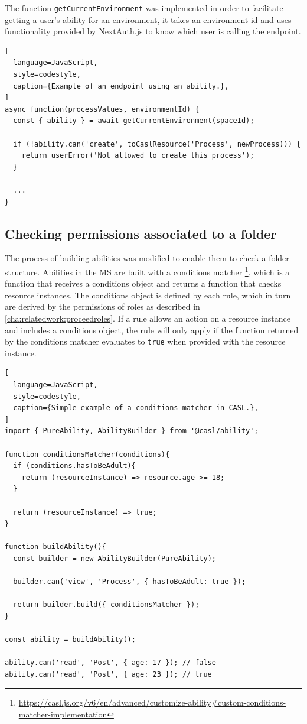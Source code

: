 The function \lstinline{getCurrentEnvironment} was implemented in order to facilitate
getting a user's ability for an environment, it takes an environment id and uses
functionality provided by NextAuth.js to know which user is calling the endpoint.

\begin{lstlisting}[
  language=JavaScript,
  style=codestyle,
  caption={Example of an endpoint using an ability.},
]
async function(processValues, environmentId) {
  const { ability } = await getCurrentEnvironment(spaceId);

  if (!ability.can('create', toCaslResource('Process', newProcess))) {
    return userError('Not allowed to create this process');
  }

  ...
}
\end{lstlisting}

\subsection{Checking permissions associated to a folder}

The process of building abilities was modified to enable them to check a folder structure.
Abilities in the MS are built with a conditions matcher
\footnote{\url{https://casl.js.org/v6/en/advanced/customize-ability\#custom-conditions-matcher-implementation}},
which is a function that receives a conditions object and returns a function that checks
resource instances.
The conditions object is defined by each rule, which in turn are derived by the
permissions of roles as described in \ref{cha:relatedwork:proceedroles}.
If a rule allows an action on a resource instance and includes a conditions object, the
rule will only apply if the function returned by the conditions matcher evaluates to
\lstinline{true} when provided with the resource instance.

\begin{lstlisting}[
  language=JavaScript,
  style=codestyle,
  caption={Simple example of a conditions matcher in CASL.},
]
import { PureAbility, AbilityBuilder } from '@casl/ability';

function conditionsMatcher(conditions){
  if (conditions.hasToBeAdult){
    return (resourceInstance) => resource.age >= 18;
  }

  return (resourceInstance) => true;
}

function buildAbility(){
  const builder = new AbilityBuilder(PureAbility);

  builder.can('view', 'Process', { hasToBeAdult: true });

  return builder.build({ conditionsMatcher });
}

const ability = buildAbility();

ability.can('read', 'Post', { age: 17 }); // false
ability.can('read', 'Post', { age: 23 }); // true
\end{lstlisting}


